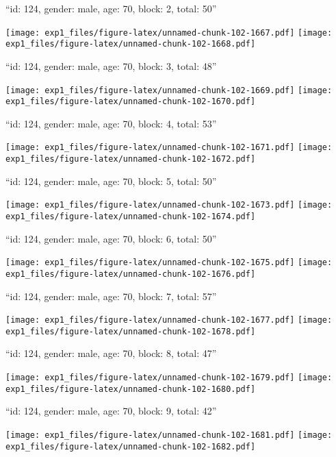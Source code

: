 \documentclass[11pt,,]{article}
\begin{document}
\newpage
[1] 

``id: 124, gender: male, age: 70, block: 2, total: 50''

\texttt{[image: exp1\_files/figure-latex/unnamed-chunk-102-1667.pdf]}
\texttt{[image: exp1\_files/figure-latex/unnamed-chunk-102-1668.pdf]}

\newpage
[1] 

``id: 124, gender: male, age: 70, block: 3, total: 48''

\texttt{[image: exp1\_files/figure-latex/unnamed-chunk-102-1669.pdf]}
\texttt{[image: exp1\_files/figure-latex/unnamed-chunk-102-1670.pdf]}

\newpage
[1] 

``id: 124, gender: male, age: 70, block: 4, total: 53''

\texttt{[image: exp1\_files/figure-latex/unnamed-chunk-102-1671.pdf]}
\texttt{[image: exp1\_files/figure-latex/unnamed-chunk-102-1672.pdf]}

\newpage
[1] 

``id: 124, gender: male, age: 70, block: 5, total: 50''

\texttt{[image: exp1\_files/figure-latex/unnamed-chunk-102-1673.pdf]}
\texttt{[image: exp1\_files/figure-latex/unnamed-chunk-102-1674.pdf]}

\newpage
[1] 

``id: 124, gender: male, age: 70, block: 6, total: 50''

\texttt{[image: exp1\_files/figure-latex/unnamed-chunk-102-1675.pdf]}
\texttt{[image: exp1\_files/figure-latex/unnamed-chunk-102-1676.pdf]}

\newpage
[1] 

``id: 124, gender: male, age: 70, block: 7, total: 57''

\texttt{[image: exp1\_files/figure-latex/unnamed-chunk-102-1677.pdf]}
\texttt{[image: exp1\_files/figure-latex/unnamed-chunk-102-1678.pdf]}

\newpage
[1] 

``id: 124, gender: male, age: 70, block: 8, total: 47''

\texttt{[image: exp1\_files/figure-latex/unnamed-chunk-102-1679.pdf]}
\texttt{[image: exp1\_files/figure-latex/unnamed-chunk-102-1680.pdf]}

\newpage
[1] 

``id: 124, gender: male, age: 70, block: 9, total: 42''

\texttt{[image: exp1\_files/figure-latex/unnamed-chunk-102-1681.pdf]}
\texttt{[image: exp1\_files/figure-latex/unnamed-chunk-102-1682.pdf]}
\end{document}
